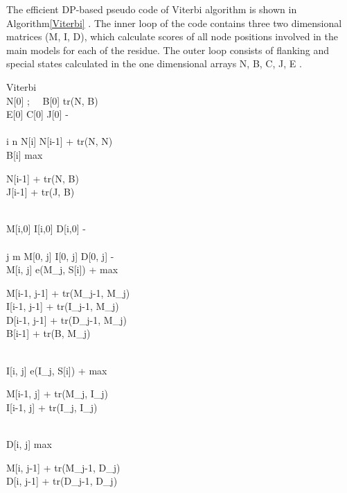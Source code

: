 The efficient DP-based pseudo code of Viterbi algorithm is shown in Algorithm\ref{Viterbi} \citep{FPGA}.  The inner loop of the code contains three two dimensional matrices (M, I, D), which calculate scores of all node positions involved in the main models for each of the residue. The outer loop consists of flanking and special states calculated in the one dimensional arrays N, B, C, J, E .

\renewcommand{\thepseudonum}{\roman{pseudonum}}
\begin{pseudocode}{Viterbi}{ }
\label{Viterbi}
\\
N[0] ; \ \  B[0] \GETS tr(N, B)\\
E[0] \GETS C[0] \GETS J[0] \GETS -\infty\\
\\
\FOR i  \TO n \DO
\BEGIN
  N[i] \GETS N[i-1] + tr(N, N)\\
  B[i] \GETS max 
  \begin{cases}
   N[i-1] + tr(N, B)\\
   J[i-1] + tr(J, B)
  \end{cases}\\
  M[i,0] \GETS I[i,0] \GETS D[i,0] \GETS -\infty\\
  \\
  \FOR j  \TO m \DO
  \BEGIN
    M[0, j] \GETS I[0, j] \GETS D[0, j] \GETS -\infty\\
    M[i, j] \GETS e(M_j, S[i]) + max 
    \begin{cases}
     M[i-1, j-1] + tr(M_{j-1}, M_j)\\
     I[i-1, j-1] + tr(I_{j-1}, M_j)\\
     D[i-1, j-1] + tr(D_{j-1}, M_j)\\
     B[i-1] + tr(B, M_j)
    \end{cases}\\
    I[i, j] \GETS e(I_j, S[i]) + max
    \begin{cases}
     M[i-1, j] + tr(M_j, I_j)\\
     I[i-1, j] + tr(I_j, I_j)
    \end{cases}\\
    D[i, j] \GETS max
    \begin{cases}
     M[i, j-1] + tr(M_{j-1}, D_j)\\
     D[i, j-1] + tr(D_{j-1}, D_j)
    \end{cases}\\
  \END\\

\end{pseudocode}
